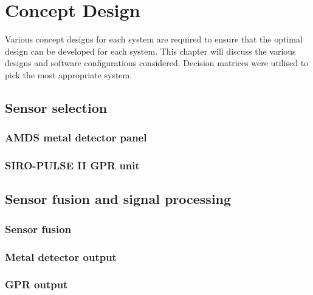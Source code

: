 \documentclass[main.tex]{subfiles}
\begin{document}
\chapter{Concept Design}
Various concept designs for each system are required to ensure that the optimal design can be developed for each system. This chapter will discuss the various designs and software configurations considered. Decision matrices were utilised to pick the most appropriate system.

\section{Sensor selection}
\subsection{AMDS metal detector panel}
\subsection{SIRO-PULSE II GPR unit}

\section{Sensor fusion and signal processing}
\subsection{Sensor fusion}
\subsection{Metal detector output}
\subsection{GPR output}
\end{document}
